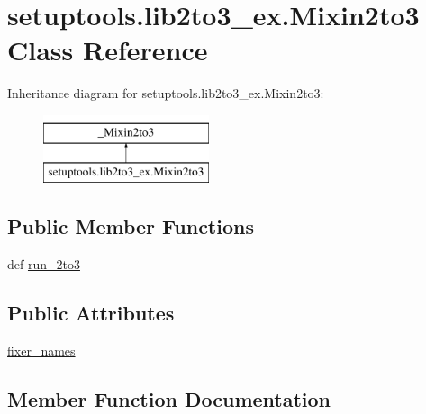 \hypertarget{classsetuptools_1_1lib2to3__ex_1_1Mixin2to3}{}\section{setuptools.\+lib2to3\+\_\+ex.\+Mixin2to3 Class Reference}
\label{classsetuptools_1_1lib2to3__ex_1_1Mixin2to3}
Inheritance diagram for setuptools.\+lib2to3\+\_\+ex.\+Mixin2to3\+:\begin{figure}[H]
\begin{center}
\leavevmode
\includegraphics[height=2.000000cm]{classsetuptools_1_1lib2to3__ex_1_1Mixin2to3}
\end{center}
\end{figure}
\subsection*{Public Member Functions}
\begin{DoxyCompactItemize}
\item 
def \hyperlink{classsetuptools_1_1lib2to3__ex_1_1Mixin2to3_a71afb97e472ebb50d5c5628ff62103ca}{run\+\_\+2to3}
\end{DoxyCompactItemize}
\subsection*{Public Attributes}
\begin{DoxyCompactItemize}
\item 
\hyperlink{classsetuptools_1_1lib2to3__ex_1_1Mixin2to3_a09fadc61ca6a8492f7bad8914da2f60c}{fixer\+\_\+names}
\end{DoxyCompactItemize}


\subsection{Member Function Documentation}
\hypertarget{classsetuptools_1_1lib2to3__ex_1_1Mixin2to3_a71afb97e472ebb50d5c5628ff62103ca}{}
